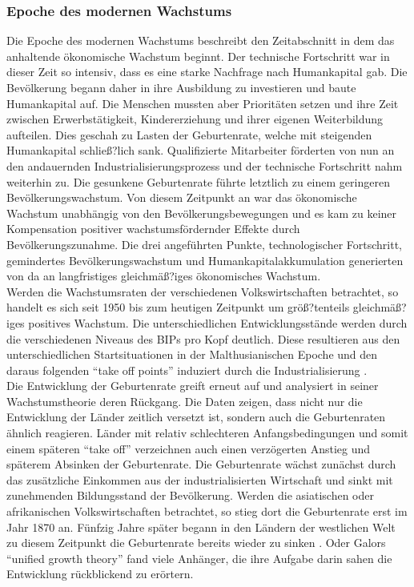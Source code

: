 \subsubsection*{Epoche des modernen Wachstums}
%
Die Epoche des modernen Wachstums beschreibt den Zeitabschnitt in dem das anhaltende ökonomische Wachstum beginnt. Der technische Fortschritt war in dieser Zeit so intensiv, dass es eine starke Nachfrage nach Humankapital gab. Die Bevölkerung begann daher in ihre Ausbildung zu investieren und baute Humankapital auf. Die Menschen mussten aber Prioritäten setzen und ihre Zeit zwischen Erwerbstätigkeit, Kindererziehung und ihrer eigenen Weiterbildung aufteilen. Dies geschah zu Lasten der Geburtenrate, welche mit steigenden Humankapital schließ?lich sank. Qualifizierte Mitarbeiter förderten von nun an den andauernden Industrialisierungsprozess und der technische Fortschritt nahm weiterhin zu. Die gesunkene Geburtenrate führte letztlich zu einem geringeren Bevölkerungswachstum. Von diesem Zeitpunkt an war das ökonomische Wachstum unabhängig von den Bevölkerungsbewegungen und es kam zu keiner Kompensation positiver wachstumsfördernder Effekte durch Bevölkerungszunahme. Die drei angeführten Punkte, technologischer Fortschritt, gemindertes Bevölkerungswachstum und Humankapitalakkumulation generierten von da an langfristiges gleichmäß?iges ökonomisches Wachstum. \\ Werden die Wachstumsraten der verschiedenen Volkswirtschaften betrachtet, so handelt es sich seit 1950 bis zum heutigen Zeitpunkt um größ?tenteils gleichmäß?iges positives Wachstum. Die unterschiedlichen Entwicklungsstände werden durch die verschiedenen Niveaus des BIPs pro Kopf deutlich. Diese resultieren aus den unterschiedlichen Startsituationen in der Malthusianischen Epoche und den daraus folgenden "`take off points"' induziert durch die Industrialisierung \cite{Galor.2014}.\\
%
Die Entwicklung der Geburtenrate greift \cite{Galor.2014} erneut auf und analysiert in seiner Wachstumstheorie deren Rückgang. Die Daten zeigen, dass nicht nur die Entwicklung der Länder zeitlich versetzt ist, sondern auch die Geburtenraten ähnlich reagieren. Länder mit relativ schlechteren Anfangsbedingungen und somit einem späteren "`take off"' verzeichnen auch einen verzögerten Anstieg und späterem Absinken der Geburtenrate. Die Geburtenrate wächst zunächst durch das zusätzliche Einkommen aus der industrialisierten Wirtschaft und sinkt mit zunehmenden Bildungsstand der Bevölkerung. Werden die asiatischen oder afrikanischen Volkswirtschaften betrachtet, so stieg dort die Geburtenrate erst im Jahr 1870 an. Fünfzig Jahre später begann in den Ländern der westlichen Welt zu diesem Zeitpunkt die Geburtenrate bereits wieder zu sinken \cite{Galor.2014}. Oder Galors "`unified growth theory"' fand viele Anhänger, die ihre Aufgabe darin sahen die Entwicklung rückblickend zu erörtern.\\
